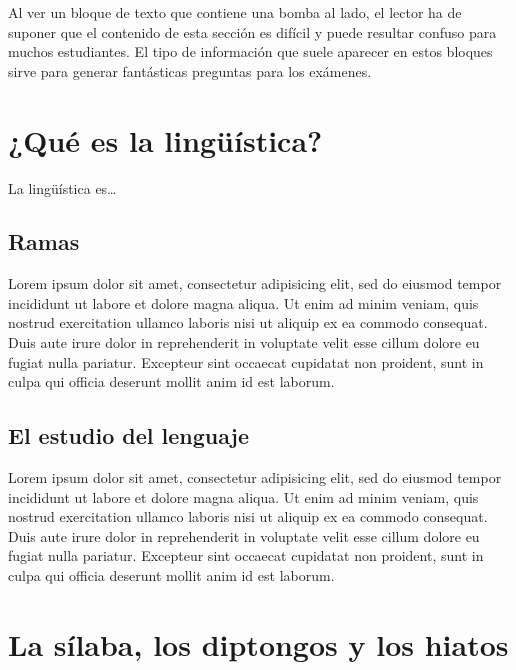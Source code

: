 \documentclass[
]{book}
\makeatletter
\newenvironment{kframe}{%
\medskip{}
\setlength{\fboxsep}{.8em}
 \def\at@end@of@kframe{}%
 \ifinner\ifhmode%
  \def\at@end@of@kframe{\end{minipage}}%
  \begin{minipage}{\columnwidth}%
 \fi\fi%
 \def\FrameCommand##1{\hskip\@totalleftmargin \hskip-\fboxsep
 \colorbox{shadecolor}{##1}\hskip-\fboxsep
     \hskip-\linewidth \hskip-\@totalleftmargin \hskip\columnwidth}%
 \MakeFramed {\advance\hsize-\width
   \@totalleftmargin\z@ \linewidth\hsize
   \@setminipage}}%
 {\par\unskip\endMakeFramed%
 \at@end@of@kframe}
\newenvironment{rmdblock}[1]
  {
  \begin{itemize}
  \renewcommand{\labelitemi}{
    \raisebox{-.7\height}[0pt][0pt]{
      {\setkeys{Gin}{width=3em,keepaspectratio}\texttt{[image: assets/images/\#1]}}
    }
  }
  \setlength{\fboxsep}{1em}
  \begin{kframe}
  \item
  }
  {
  \end{kframe}
  \end{itemize}
  }
\newenvironment{rmdteach}
  {\begin{rmdblock}{teach}}
  {\end{rmdblock}}
\makeatother
\begin{document}
\begin{rmdteach}
Al ver un bloque de texto que contiene una bomba al lado, el lector ha
de suponer que el contenido de esta sección es difícil y puede resultar
confuso para muchos estudiantes. El tipo de información que suele
aparecer en estos bloques sirve para generar fantásticas preguntas para
los exámenes.
\end{rmdteach}

\citet{xie2015}

\hypertarget{intro}{%
\chapter{¿Qué es la lingüística?}\label{intro}}

La lingüística es\ldots{}

\hypertarget{ramas}{%
\section{Ramas}\label{ramas}}

Lorem ipsum dolor sit amet, consectetur adipisicing elit, sed do eiusmod
tempor incididunt ut labore et dolore magna aliqua. Ut enim ad minim veniam,
quis nostrud exercitation ullamco laboris nisi ut aliquip ex ea commodo
consequat. Duis aute irure dolor in reprehenderit in voluptate velit esse
cillum dolore eu fugiat nulla pariatur. Excepteur sint occaecat cupidatat non
proident, sunt in culpa qui officia deserunt mollit anim id est laborum.

\hypertarget{el-estudio-del-lenguaje}{%
\section{El estudio del lenguaje}\label{el-estudio-del-lenguaje}}

Lorem ipsum dolor sit amet, consectetur adipisicing elit, sed do eiusmod
tempor incididunt ut labore et dolore magna aliqua. Ut enim ad minim veniam,
quis nostrud exercitation ullamco laboris nisi ut aliquip ex ea commodo
consequat. Duis aute irure dolor in reprehenderit in voluptate velit esse
cillum dolore eu fugiat nulla pariatur. Excepteur sint occaecat cupidatat non
proident, sunt in culpa qui officia deserunt mollit anim id est laborum.

\hypertarget{silaba}{%
\chapter{La sílaba, los diptongos y los hiatos}\label{silaba}}
\end{document}
